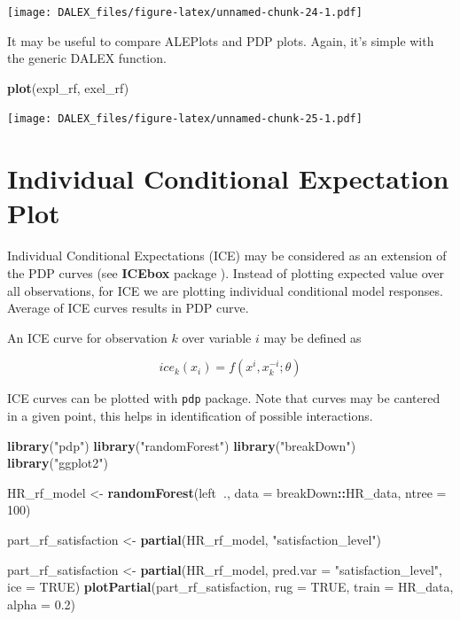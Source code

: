 \documentclass[]{book}
\newenvironment{Shaded}{\begin{snugshade}}{\end{snugshade}}
\newcommand{\KeywordTok}[1]{\textcolor[rgb]{0.13,0.29,0.53}{\textbf{#1}}}
\newcommand{\DataTypeTok}[1]{\textcolor[rgb]{0.13,0.29,0.53}{#1}}
\newcommand{\DecValTok}[1]{\textcolor[rgb]{0.00,0.00,0.81}{#1}}
\newcommand{\FloatTok}[1]{\textcolor[rgb]{0.00,0.00,0.81}{#1}}
\newcommand{\StringTok}[1]{\textcolor[rgb]{0.31,0.60,0.02}{#1}}
\newcommand{\OtherTok}[1]{\textcolor[rgb]{0.56,0.35,0.01}{#1}}
\newcommand{\OperatorTok}[1]{\textcolor[rgb]{0.81,0.36,0.00}{\textbf{#1}}}
\newcommand{\NormalTok}[1]{#1}
\theoremstyle{definition}
\theoremstyle{definition}
\theoremstyle{definition}
\theoremstyle{remark}
\begin{document}
\texttt{[image: DALEX\_files/figure-latex/unnamed-chunk-24-1.pdf]}

It may be useful to compare ALEPlots and PDP plots. Again, it's simple
with the generic DALEX function.

\begin{Shaded}
\begin{Highlighting}[]
\KeywordTok{plot}\NormalTok{(expl_rf, exel_rf)}
\end{Highlighting}
\end{Shaded}

\texttt{[image: DALEX\_files/figure-latex/unnamed-chunk-25-1.pdf]}

\section{Individual Conditional Expectation
Plot}\label{individual-conditional-expectation-plot}

Individual Conditional Expectations (ICE) may be considered as an
extension of the PDP curves (see \textbf{ICEbox} package
\citep{ICEbox}). Instead of plotting expected value over all
observations, for ICE we are plotting individual conditional model
responses. Average of ICE curves results in PDP curve.

An ICE curve for observation \(k\) over variable \(i\) may be defined as

\[
ice_k(x_i) = f(x^i, x_k^{-i}; \theta) 
\]

ICE curves can be plotted with \texttt{pdp} package. Note that curves
may be cantered in a given point, this helps in identification of
possible interactions.

\begin{Shaded}
\begin{Highlighting}[]
\KeywordTok{library}\NormalTok{(}\StringTok{"pdp"}\NormalTok{)}
\KeywordTok{library}\NormalTok{(}\StringTok{"randomForest"}\NormalTok{)}
\KeywordTok{library}\NormalTok{(}\StringTok{"breakDown"}\NormalTok{)}
\KeywordTok{library}\NormalTok{(}\StringTok{"ggplot2"}\NormalTok{)}

\NormalTok{HR_rf_model <-}\StringTok{ }\KeywordTok{randomForest}\NormalTok{(left}\OperatorTok{~}\NormalTok{., }\DataTypeTok{data =}\NormalTok{ breakDown}\OperatorTok{::}\NormalTok{HR_data, }\DataTypeTok{ntree =} \DecValTok{100}\NormalTok{)}

\NormalTok{part_rf_satisfaction <-}\StringTok{ }\KeywordTok{partial}\NormalTok{(HR_rf_model, }\StringTok{"satisfaction_level"}\NormalTok{)}

\NormalTok{part_rf_satisfaction <-}\StringTok{ }\KeywordTok{partial}\NormalTok{(HR_rf_model, }\DataTypeTok{pred.var =} \StringTok{"satisfaction_level"}\NormalTok{, }\DataTypeTok{ice =} \OtherTok{TRUE}\NormalTok{)}
\KeywordTok{plotPartial}\NormalTok{(part_rf_satisfaction, }\DataTypeTok{rug =} \OtherTok{TRUE}\NormalTok{, }\DataTypeTok{train =}\NormalTok{ HR_data, }\DataTypeTok{alpha =} \FloatTok{0.2}\NormalTok{)}
\end{Highlighting}
\end{Shaded}
\end{document}
